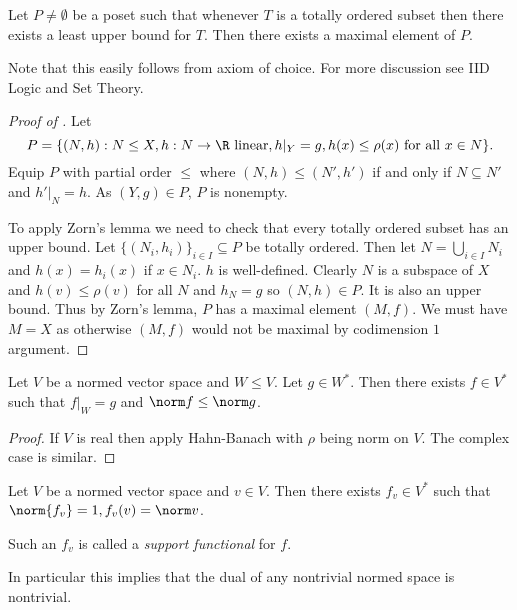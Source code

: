 \documentclass[a4paper]{article}
\begin{document}
\begin{proposition}
  Let \(P \neq \emptyset\) be a poset such that whenever \(T\) is a totally ordered subset then there exists a least upper bound for \(T\). Then there exists a maximal element of \(P\).
\end{proposition}

Note that this easily follows from axiom of choice. For more discussion see IID Logic and Set Theory.

\begin{proof}[Proof of ]
  Let
  \[
    P = \{(N, h): N \leq X, h: N \to \R \text{ linear}, h|_Y = g, h(x) \leq \rho(x) \text{ for all } x \in N\}.
  \]
  Equip \(P\) with partial order \(\leq\) where \((N, h) \leq (N', h')\) if and only if \(N \subseteq N'\) and \(h'|_N = h\). As \((Y, g) \in P\), \(P\) is nonempty.

  To apply Zorn's lemma we need to check that every totally ordered subset has an upper bound. Let \(\{(N_i, h_i)\}_{i \in I} \subseteq P\) be totally ordered. Then let \(N = \bigcup_{i \in I} N_i\) and \(h(x) = h_i(x)\) if \(x \in N_i\). \(h\) is well-defined. Clearly \(N\) is a subspace of \(X\) and \(h(v) \leq \rho(v)\) for all \(N\) and \(h_N = g\) so \((N, h) \in P\). It is also an upper bound. Thus by Zorn's lemma, \(P\) has a maximal element \((M, f)\). We must have \(M = X\) as otherwise \((M, f)\) would not be maximal by codimension \(1\) argument.
\end{proof}

\begin{corollary}
  Let \(V\) be a normed vector space and \(W \leq V\). Let \(g \in W^*\). Then there exists \(f \in V^*\) such that \(f|_W = g\) and \(\norm f \leq \norm g\).
\end{corollary}

\begin{proof}
  If \(V\) is real then apply Hahn-Banach with \(\rho\) being norm on \(V\). The complex case is similar.
\end{proof}

\begin{corollary}
  Let \(V\) be a normed vector space and \(v \in V\). Then there exists \(f_v \in V^*\) such that \(\norm{f_v} = 1, f_v(v) = \norm v\).

  Such an \(f_v\) is called a \emph{support functional} for \(f\).
\end{corollary}

In particular this implies that the dual of any nontrivial normed space is nontrivial.
\end{document}

